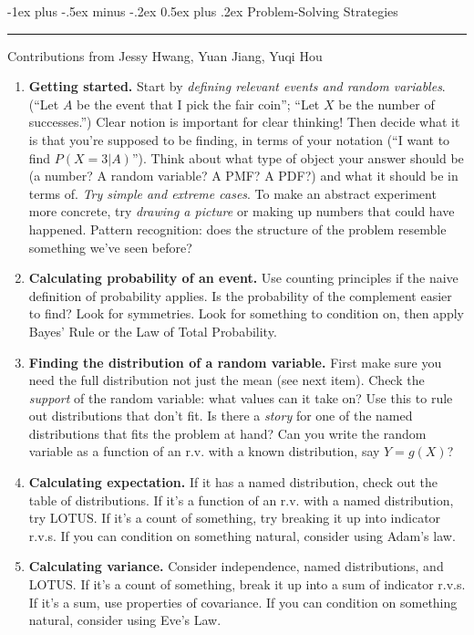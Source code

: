 \documentclass[10pt,landscape]{article}
\makeatletter
\renewcommand{\section}{\@startsection{section}{1}{0mm}%
                                {-1ex plus -.5ex minus -.2ex}%
                                {0.5ex plus .2ex}%
                                {\normalfont\large\bfseries}}
\makeatother
\begin{document}
\begin{multicols*}{3}
							
	\section{Problem-Solving Strategies} \smallskip \hrule height 2pt \smallskip
	Contributions from Jessy Hwang, Yuan Jiang, Yuqi Hou
	\begin{enumerate}
		\item \textbf{Getting started.} Start by \emph{defining relevant events and random variables}. (``Let $A$ be the event that I pick the fair coin''; ``Let $X$ be the number of successes.'') Clear notion is important for clear thinking! Then decide what it is that you're supposed to be finding, in terms of your notation (``I want to find $P(X=3|A)$''). Think about what type of object your answer should be (a number? A random variable? A PMF? A PDF?) and what it should be in terms of.
        \emph{Try simple and extreme cases}. To make an abstract experiment more concrete, try \emph{drawing a picture} or making up numbers that could have happened. Pattern recognition: does the structure of the problem resemble something we've seen before?
		
		\item \textbf{Calculating probability of an event.} Use counting principles if the naive definition of probability applies. Is the probability of the complement easier to find? Look for symmetries. Look for something to condition on, then apply Bayes' Rule or the Law of Total Probability. 
		
		\item \textbf{Finding the distribution of a random variable.} First make sure you need the full distribution not just the mean (see next item). Check the \emph{support} of the random variable: what values can it take on? Use this to rule out distributions that don't fit.  Is there a     \emph{story} for one of the named distributions that fits the problem at hand?  Can you write the random variable as a function of an r.v. with a known distribution, say $Y = g(X)$?
		
		\item \textbf{Calculating expectation.} If it has a named distribution, check out the table of distributions. If it's a function of an r.v. with a named distribution, try LOTUS. If it's a count of something, try breaking it up into indicator r.v.s. If you can condition on something natural, consider using Adam's law. 
		
		\item \textbf{Calculating variance.} Consider independence, named distributions, and LOTUS. If it's a count of something, break it up into a sum of indicator r.v.s. If it's a sum, use properties of covariance. If you can condition on something natural, consider using Eve's Law.
		

\end{enumerate}
\end{multicols*}
\end{document}
